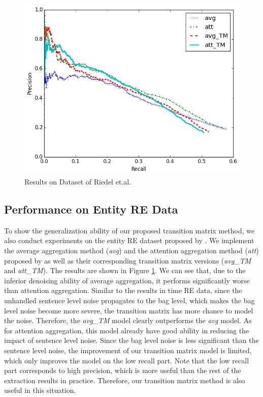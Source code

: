 \begin{figure}[htbp]
\includegraphics[width=0.9\linewidth]{figures/re_att_avg_cmp_exp.png}
\caption{Results on Dataset of Riedel et.al.}
\label{fig: Riedel_res}
\end{figure}

\subsection{Performance on Entity RE Data}
To show the generalization ability of our proposed transition matrix method, we also conduct experiments on the entity RE dataset proposed by \cite{riedel2010modeling}. We implement the average aggregation method (\emph{avg}) and the attention aggregation method (\emph{att}) proposed by \cite{lin2016neural} as well as their corresponding transition matrix versions (\emph{avg\_TM} and \emph{att\_TM}). The results are shown in Figure \ref{fig: Riedel_res}. We can see that, due to the inferior denoising ability of average aggregation, it performs significantly worse than attention aggregation. Similar to the results in time RE data, since the unhandled sentence level noise propagates to the bag level, which makes the bag level noise become more severe, the transition matrix has more chance to model the noise. Therefore, the \emph{avg\_TM} model clearly outperforms the \emph{avg} model. As for attention aggregation, this model already have good ability in reducing the impact of sentence level noise. Since the bag level noise is less significant than the sentence level noise, the improvement of our transition matrix model is limited, which only improves the model on the low recall part. Note that the low recall part corresponds to high precision, which is more useful than the rest of the extraction results in practice. Therefore, our transition matrix method is also useful in this situation.

